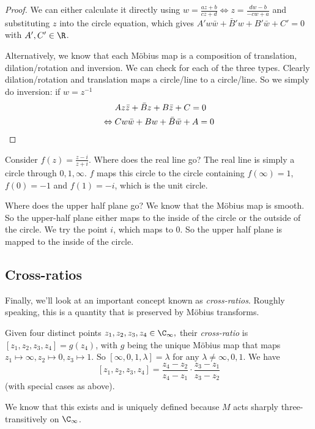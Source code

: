 \documentclass[a4paper]{article}
\begin{document}
\begin{proof}
  We can either calculate it directly using $w = \frac{az + b}{cz + d}\Leftrightarrow z = \frac{dw - b}{-cw + a}$ and substituting $z$ into the circle equation, which gives $A' w\bar w + \bar B' w + B'\bar w + C' = 0$ with $A', C'\in \R$.

  Alternatively, we know that each M\"obius map is a composition of translation, dilation/rotation and inversion. We can check for each of the three types. Clearly dilation/rotation and translation maps a circle/line to a circle/line. So we simply do inversion: if $w = z^{-1}$
  \begin{align*}
    &\; Az\bar z + \bar Bz + B\bar z + C = 0\\
    \Leftrightarrow &\; Cw\bar w + Bw + \bar B\bar w + A = 0\qedhere
  \end{align*}
\end{proof}

\begin{eg}
  Consider $f(z) = \frac{z - i}{z + i}$. Where does the real line go? The real line is simply a circle through $0, 1, \infty$. $f$ maps this circle to the circle containing $f(\infty) = 1$, $f(0) = -1$ and $f(1) = -i$, which is the unit circle.

  Where does the upper half plane go? We know that the M\"obius map is smooth. So the upper-half plane either maps to the inside of the circle or the outside of the circle. We try the point $i$, which maps to $0$. So the upper half plane is mapped to the inside of the circle.
\end{eg}
\subsection{Cross-ratios}
  Finally, we'll look at an important concept known as \emph{cross-ratios}. Roughly speaking, this is a quantity that is preserved by M\"obius transforms.

\begin{defi}
  Given four distinct points $z_1, z_2, z_3, z_4\in \C_\infty,$ their \emph{cross-ratio} is $[z_1, z_2, z_3, z_4] = g(z_4)$, with $g$ being the unique M\"obius map that maps $z_1\mapsto \infty, z_2\mapsto 0, z_3\mapsto 1$. So $[\infty, 0, 1, \lambda] = \lambda$ for any $\lambda\not= \infty, 0, 1$. We have
  \[
    [z_1, z_2, z_3, z_4] = \frac{z_4 - z_2}{z_4 - z_1} \cdot \frac{z_3 - z_1}{z_3 - z_2}
  \]
  (with special cases as above).
\end{defi}
We know that this exists and is uniquely defined because $M$ acts sharply three-transitively on $\C_\infty$.
\end{document}
